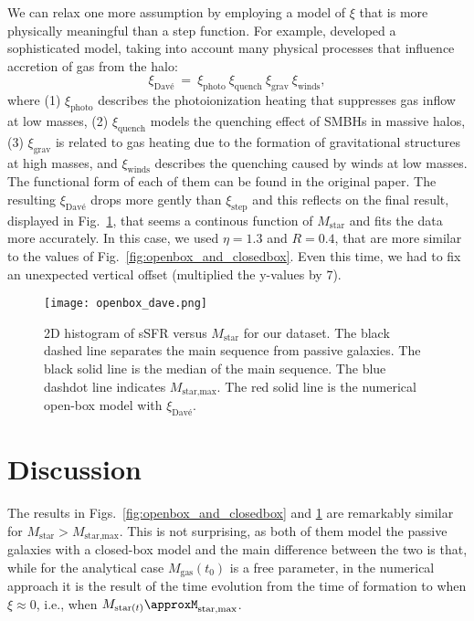 \documentclass[fleqn,usenatbib]{mnras}
\begin{document}
We can relax one more assumption by employing a model of $\xi$ that is more physically meaningful than a step function. For example, \citet{Dave_2011} developed a sophisticated model, taking into account many physical processes that influence accretion of gas from the halo:
\begin{equation}
    \xi_\text{Davé} \: = \: \xi_\text{photo} \: \xi_\text{quench} \: \xi_\text{grav} \: \xi_\text{winds}, 
	\label{eq:xi_dave}
\end{equation}
where (1) $\xi_\text{photo}$ describes the photoionization heating that suppresses gas inflow at low masses, (2) $\xi_\text{quench}$ models the quenching effect of SMBHs in massive halos, (3) $\xi_\text{grav}$ is related to gas heating due to the formation of gravitational structures at high masses, and $\xi_\text{winds}$ describes the quenching caused by winds at low masses. The functional form of each of them can be found in the original paper. The resulting $\xi_\text{Davé}$ drops more gently than $\xi_\text{step}$ and this reflects on the final result, displayed in Fig.~\ref{fig:openbox_dave}, that seems a continous function of $M_\text{star}$ and fits the data more accurately. In this case, we used $\eta=1.3$ and $R=0.4$, that are more similar to the values of Fig.~\ref{fig:openbox_and_closedbox}. Even this time, we had to fix an unexpected vertical offset (multiplied the y-values by $7$).

\begin{figure}\centering
	\texttt{[image: openbox\_dave.png]}
    \caption{2D histogram of sSFR versus $M_{\text{star}}$ for our dataset. The black dashed line separates the main sequence from passive galaxies. The black solid line is the median of the main sequence. The blue dashdot line indicates $M_{\text{star,max}}$. The red solid line is the numerical open-box model with $\xi_\text{Davé}$.}
    \label{fig:openbox_dave}
\end{figure}



\section{Discussion}\label{sec:discussion}
The results in Figs.~\ref{fig:openbox_and_closedbox} and \ref{fig:openbox_dave} are remarkably similar for $M_{\text{star}}>M_{\text{star,max}}$. This is not surprising, as both of them model the passive galaxies with a closed-box model and the main difference between the two is that, while for the analytical case $M_\text{gas}(t_0)$ is a free parameter, in the numerical approach it is the result of the time evolution from the time of formation to when $\xi \approx 0$, i.e., when $M_{\text{star}(t)}\approxM_{\text{star,max}}$.
\end{document}
